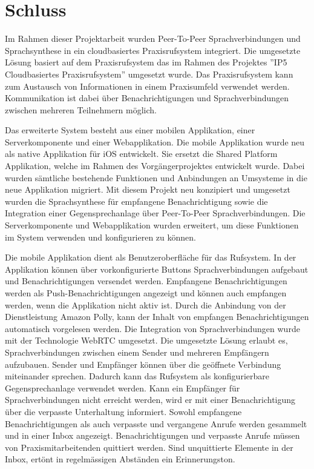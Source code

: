 \section{Schluss}

Im Rahmen dieser Projektarbeit wurden Peer-To-Peer Sprachverbindungen und Sprachsynthese in ein cloudbasiertes Praxisrufsystem integriert.
Die umgesetzte Lösung basiert auf dem Praxisrufsystem das im Rahmen des Projektes ''IP5 Cloudbasiertes Praxisrufsystem'' umgesetzt wurde.
Das Praxisrufsystem kann zum Austausch von Informationen in einem Praxisumfeld verwendet werden.
Kommunikation ist dabei über Benachrichtigungen und Sprachverbindungen zwischen mehreren Teilnehmern möglich.

Das erweiterte System besteht aus einer mobilen Applikation, einer Serverkomponente und einer Webapplikation.
Die mobile Applikation wurde neu als native Applikation für iOS entwickelt.
Sie ersetzt die Shared Platform Applikation, welche im Rahmen des Vorgängerprojektes entwickelt wurde.
Dabei wurden sämtliche bestehende Funktionen und Anbindungen an Umsysteme in die neue Applikation migriert.
Mit diesem Projekt neu konzipiert und umgesetzt wurden die Sprachsynthese für empfangene Benachrichtigung sowie die Integration einer Gegensprechanlage über Peer-To-Peer Sprachverbindungen.
Die Serverkomponente und Webapplikation wurden erweitert, um diese Funktionen im System verwenden und konfigurieren zu können.

Die mobile Applikation dient als Benutzeroberfläche für das Rufsystem.
In der Applikation können über vorkonfigurierte Buttons Sprachverbindungen aufgebaut und Benachrichtigungen versendet werden.
Empfangene Benachrichtigungen werden als Push-Benachrichtigungen angezeigt und können auch empfangen werden, wenn die Applikation nicht aktiv ist.
Durch die Anbindung von der Dienstleistung Amazon Polly, kann der Inhalt von empfangen Benachrichtigungen automatisch vorgelesen werden.
Die Integration von Sprachverbindungen wurde mit der Technologie WebRTC umgesetzt.
Die umgesetzte Lösung erlaubt es, Sprachverbindungen zwischen einem Sender und mehreren Empfängern aufzubauen.
Sender und Empfänger können über die geöffnete Verbindung miteinander sprechen.
Dadurch kann das Rufsystem als konfigurierbare Gegensprechanlage verwendet werden.
Kann ein Empfänger für Sprachverbindungen nicht erreicht werden, wird er mit einer Benachrichtigung über die verpasste Unterhaltung informiert.
Sowohl empfangene Benachrichtigungen als auch verpasste und vergangene Anrufe werden gesammelt und in einer Inbox angezeigt.
Benachrichtigungen und verpasste Anrufe müssen von Praxismitarbeitenden quittiert werden.
Sind unquittierte Elemente in der Inbox, ertönt in regelmässigen Abständen ein Erinnerungston.

